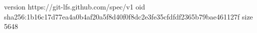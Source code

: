 version https://git-lfs.github.com/spec/v1
oid sha256:1b16c17d77ea4a0b4af20a5f8d40f0f8dc2e3fe35cfdfdf2365b79bae461127f
size 5648
